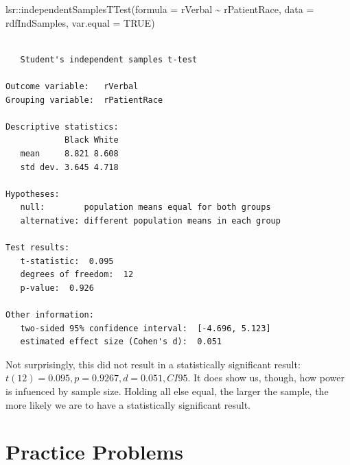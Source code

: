 \documentclass[
  11pt,
]{book}
\newenvironment{Shaded}{\begin{snugshade}}{\end{snugshade}}
\newcommand{\AttributeTok}[1]{\textcolor[rgb]{0.77,0.63,0.00}{#1}}
\newcommand{\ConstantTok}[1]{\textcolor[rgb]{0.00,0.00,0.00}{#1}}
\newcommand{\FunctionTok}[1]{\textcolor[rgb]{0.00,0.00,0.00}{#1}}
\newcommand{\NormalTok}[1]{#1}
\newcommand{\OtherTok}[1]{\textcolor[rgb]{0.56,0.35,0.01}{#1}}
\newcommand{\SpecialCharTok}[1]{\textcolor[rgb]{0.00,0.00,0.00}{#1}}
\newcommand{\StringTok}[1]{\textcolor[rgb]{0.31,0.60,0.02}{#1}}
\begin{document}
\begin{Shaded}
\end{Shaded}

\begin{Shaded}
\begin{Highlighting}[]
\NormalTok{lsr}\SpecialCharTok{::}\FunctionTok{independentSamplesTTest}\NormalTok{(}\AttributeTok{formula =}\NormalTok{ rVerbal }\SpecialCharTok{\textasciitilde{}}\NormalTok{ rPatientRace, }\AttributeTok{data =}\NormalTok{ rdfIndSamples,}
    \AttributeTok{var.equal =} \ConstantTok{TRUE}\NormalTok{)}
\end{Highlighting}
\end{Shaded}

\begin{verbatim}

   Student's independent samples t-test 

Outcome variable:   rVerbal 
Grouping variable:  rPatientRace 

Descriptive statistics: 
            Black White
   mean     8.821 8.608
   std dev. 3.645 4.718

Hypotheses: 
   null:        population means equal for both groups
   alternative: different population means in each group

Test results: 
   t-statistic:  0.095 
   degrees of freedom:  12 
   p-value:  0.926 

Other information: 
   two-sided 95% confidence interval:  [-4.696, 5.123] 
   estimated effect size (Cohen's d):  0.051 
\end{verbatim}

Not surprisingly, this did not result in a statistically significant result: \(t(12) = 0.095, p = 0.9267, d = 0.051, CI95%
\). It does show us, though, how power is infuenced by sample size. Holding all else equal, the larger the sample, the more likely we are to have a statistically significant result.

\hypertarget{practice-problems-3}{%
\section{Practice Problems}\label{practice-problems-3}}
\end{document}
